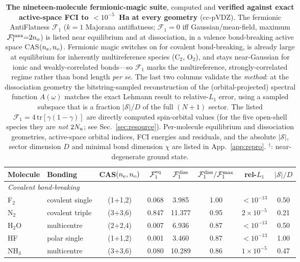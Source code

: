 \begin{table}[t]\centering\small
\caption{\textbf{The nineteen-molecule fermionic-magic suite}, computed and \textbf{verified
against exact active-space FCI to $<10^{-5}$~Ha at every geometry} (cc-pVDZ). The fermionic
AntiFlatness $\mathcal F_1$ ($k{=}1$ Majorana antiflatness; $\mathcal F_1{=}0$ iff Gaussian/mean-field, maximum
$\mathcal F_1^{\max}{=}2n_{\rm o}$) is listed near equilibrium and at dissociation, in a valence
bond-breaking active space CAS$(n_e,n_{\rm o})$. Fermionic magic switches on for covalent
bond-breaking, is already large at equilibrium for inherently multireference species
($\mathrm{C_2}$, $\mathrm{O_2}$), and stays near-Gaussian for ionic and weakly-correlated
bonds---so $\mathcal F_1$ marks the multireference, strongly-correlated regime rather than bond length
\emph{per se}. The last two columns validate the \emph{method}: at the dissociation geometry the
bitstring-sampled reconstruction of the (orbital-projected) spectral function $A(\omega)$ matches
the exact Lehmann result to relative-$L_1$ error, using a sampled subspace that is a fraction
$|\mathcal{S}|/D$ of the full $(N{+}1)$ sector. The listed $\mathcal F_1=4\,\mathrm{tr}[\gamma(1-\gamma)]$
are directly computed spin-orbital values (for the five open-shell species they are \emph{not} $2N_{\rm u}$;
see Sec.~\ref{sec:resource}). Per-molecule equilibrium and dissociation geometries, active-space orbital
indices, FCI energies and residuals, and the absolute $|\mathcal S|$, sector dimension $D$ and minimal bond
dimension $\chi$ are listed in App.~\ref{app:repro}. $^{\dagger}$: near-degenerate ground state.}
\label{tab:molecules}
\begin{tabular}{llcccccc}\hline\hline
Molecule & Bonding & CAS$(n_e,n_{\rm o})$ & $\mathcal F_1^{\rm eq}$ & $\mathcal F_1^{\rm diss}$ & $\mathcal F_1^{\rm diss}/\mathcal F_1^{\max}$ & rel-$L_1$ & $|\mathcal{S}|/D$ \\ \hline
\multicolumn{8}{l}{\emph{Covalent bond-breaking}}\\
F$_2$ & covalent single & (1+1,2) & 0.068 & 3.985 & 1.00 & $<\!10^{-13}$ & 0.50 \\
N$_2$ & covalent triple & (3+3,6) & 0.847 & 11.377 & 0.95 & $2\times10^{-5}$ & 0.21 \\
H$_2$O & multicentre & (2+2,4) & 0.007 & 6.936 & 0.87 & $<\!10^{-13}$ & 0.50 \\
HF & polar single & (1+1,2) & 0.001 & 3.460 & 0.87 & $<\!10^{-13}$ & 1.00 \\
NH$_3$ & multicentre & (3+3,6) & 0.080 & 10.289 & 0.86 & $1\times10^{-5}$ & 0.47 \\

\end{tabular}
\end{table}
